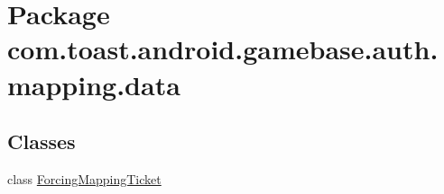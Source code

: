\hypertarget{namespacecom_1_1toast_1_1android_1_1gamebase_1_1auth_1_1mapping_1_1data}{}\section{Package com.\+toast.\+android.\+gamebase.\+auth.\+mapping.\+data}
\label{namespacecom_1_1toast_1_1android_1_1gamebase_1_1auth_1_1mapping_1_1data}
\subsection*{Classes}
\begin{DoxyCompactItemize}
\item 
class \hyperlink{classcom_1_1toast_1_1android_1_1gamebase_1_1auth_1_1mapping_1_1data_1_1_forcing_mapping_ticket}{Forcing\+Mapping\+Ticket}
\end{DoxyCompactItemize}

